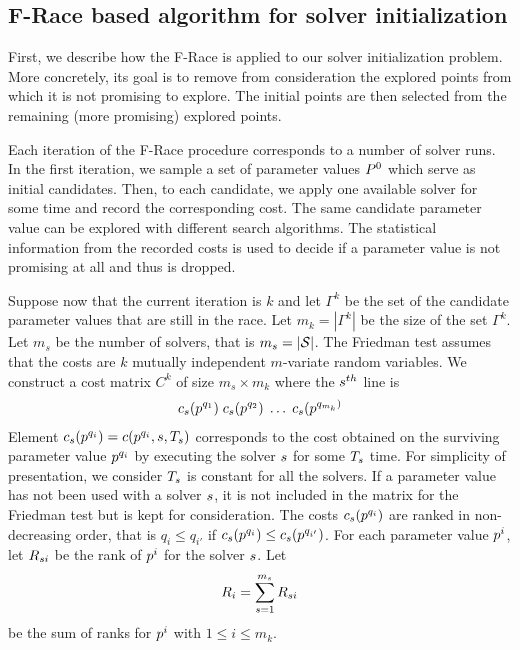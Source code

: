 \subsection{F-Race based algorithm for solver initialization}

First, we describe how the F-Race is applied to our solver initialization problem. More concretely, its goal is to remove from consideration the explored points from which it is not promising to explore. The initial points are then selected from the remaining (more promising) explored points.

Each iteration of the F-Race procedure corresponds to a number of solver runs. In the first iteration, we sample a set of parameter values $P^0$ which serve as initial candidates. Then, to each candidate, we apply one available solver for some time and record the corresponding cost. The same candidate parameter value can be explored with different search algorithms. The statistical information from the recorded costs is used to decide if a parameter value is not promising at all and thus is dropped. 

Suppose now that the current iteration is $k$ and let $\Gamma^k$ be the set of the candidate parameter values that are still in the race. Let $m_k = | \Gamma^k | $ be the size of the set $\Gamma^k$. Let $m_s$ be the number of solvers, that is $m_s = | \mathcal{S} |$. The Friedman test assumes that the costs are $k$ mutually independent $m$-variate random variables. We construct a cost matrix $C^k$ of size $m_s \times m_k$ where the $s^{th}$ line is
\begin{eqnarray}\label{eq:C}
c_{s}(p^{q_1})  \; c_{s}(p^{q_2}) \; \ldots  \; c_{s}(p^{q_{m_k})} 
\end{eqnarray}
Element $c_{s}(p^{q_i}) = c(p^{q_i}, s, T_{s})$ corresponds to the cost obtained on the surviving parameter value $p^{q_i}$ by executing the solver $s$ for some $T_{s}$ time. For simplicity of presentation, we consider $T_{s}$ is constant for all the solvers. If a parameter value has not been used with a solver $s$, it is not included in the matrix for the Friedman test but is kept for consideration. The costs $c_{s}(p^{q_i})$ are ranked in non-decreasing order, that is $q_i \le q_{i'}$ if $c_{s}(p^{q_i}) \le c_{s}(p^{q_{i'}})$. For each parameter value $p^i$, let $R_{s i}$ be the rank of $p^i$ for the solver $s$. Let $$R_i =  \sum_{s=1}^{m_s} R_{{s} i}$$ 
be the sum of ranks for $p^i$ with $1 \leq i \leq m_k$. 

